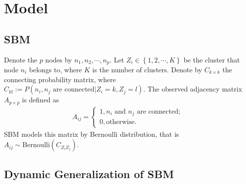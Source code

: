 \section{Model}

\subsection{SBM}
Denote the $p$ nodes by $n_1, n_2, \cdots, n_p$. Let $Z_i\in \left\{ 1,2,\cdots,K \right\}$ be the cluster that node $n_i$ belongs to, where $K$ is the number of clusters. Denote by $C_{k\times k} $ the connecting probability matrix, where $C_{kl}:= P(n_i, n_j \text{ are connected}|Z_i=k, Z_j=l) $.
The observed adjacency matrix $A_{p\times p}$ is defined as
\begin{align*}
A_{ij}=\begin{cases}
1, n_i \text{ and } n_j \text{ are connected};\\
0, \text{otherwise}.
\end{cases}
\end{align*}
SBM models this matrix by Bernoulli distribution, that is $A_{ij}\sim 	\text{Bernoulli}(C_{Z_iZ_j})$.




\subsection{Dynamic Generalization of SBM}

